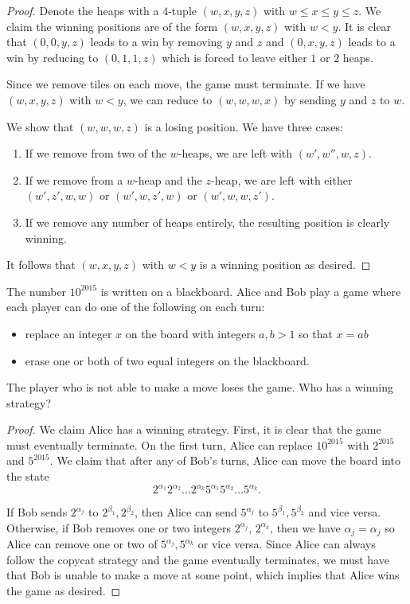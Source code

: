 \documentclass[11pt]{article}
\renewcommand{\>}{\rangle}
\newcommand{\<}{\langle}
\begin{document}
\begin{proof}
Denote the heaps with a $4$-tuple $(w, x, y, z)$ with $w \le x \le y \le z$.  We claim the winning positions are of the form $(w, x, y, z)$ with $w < y$.  It is clear that $(0, 0, y, z)$ leads to a win by removing $y$ and $z$ and $(0, x, y, z)$ leads to a win by reducing to $(0, 1, 1, z)$ which is forced to leave either $1$ or $2$ heaps.

Since we remove tiles on each move, the game must terminate.  If we have $(w, x, y, z)$ with $w < y$, we can reduce to $(w, w, w, x)$ by sending $y$ and $z$ to $w$.

We show that $(w, w, w, z)$ is a losing position.  We have three cases:
\begin{enumerate}
\item If we remove from two of the $w$-heaps, we are left with $(w', w'', w, z)$.
\item If we remove from a $w$-heap and the $z$-heap, we are left with either $(w', z', w, w)$ or $(w', w, z', w)$ or $(w', w, w, z')$.
\item If we remove any number of heaps entirely, the resulting position is clearly winning.
\end{enumerate}

It follows that $(w, x, y, z)$ with $w < y$ is a winning position as desired. 
\end{proof}

\begin{problem} The number $10^{2015}$ is written on a blackboard.  Alice and Bob play a game where each player can do one of the following on each turn:
\begin{itemize}
\item replace an integer $x$ on the board with integers $a, b > 1$ so that $x = ab$
\item erase one or both of two equal integers on the blackboard.  
\end{itemize}
The player who is not able to make a move loses the game.  Who has a winning strategy?
\end{problem}
\begin{proof}
We claim Alice has a winning strategy.  First, it is clear that the game must eventually terminate.  On the first turn, Alice can replace $10^{2015}$ with $2^{2015}$ and $5^{2015}$.  We claim that after any of Bob's turns, Alice can move the board into the state 
$$2^{\alpha_1} 2^{\alpha_2} \dots 2^{\alpha_k} 5^{\alpha_1} 5^{\alpha_2} \dots 5^{\alpha_k}.$$

If Bob sends $2^{\alpha_j}$ to $2^{\beta_1} ,2^{\beta_2}$, then Alice can send $5^{\alpha_j}$ to $5^{\beta_1} , 5^{\beta_2}$ and vice versa.  Otherwise, if Bob removes one or two integers $2^{\alpha_j}$, $2^{\alpha_k}$, then we have $\alpha_j = \alpha_j$ so Alice can remove one or two of $5^{\alpha_j}, 5^{\alpha_k}$ or vice versa.  Since Alice can always follow the copycat strategy and the game eventually terminates, we must have that Bob is unable to make a move at some point, which implies that Alice wins the game as desired.   
\end{proof}
\end{document}
